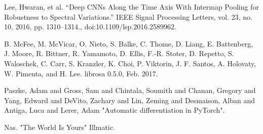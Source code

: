\documentclass[10pt,twocolumn,letterpaper]{article}
\begin{document}
\begin{thebibliography}{1}

Lee, Hwaran, et al. “Deep CNNs Along the Time Axis With Intermap Pooling for Robustness to Spectral Variations.” IEEE Signal Processing Letters, vol. 23, no. 10, 2016, pp. 1310–1314., doi:10.1109/lsp.2016.2589962.

B. McFee, M. McVicar, O. Nieto, S. Balke, C. Thome,
D. Liang, E. Battenberg, J. Moore, R. Bittner, R. Yamamoto,
D. Ellis, F.-R. Stoter, D. Repetto, S. Waloschek, C. Carr,
S. Kranzler, K. Choi, P. Viktorin, J. F. Santos, A. Holovaty,
W. Pimenta, and H. Lee. librosa 0.5.0, Feb. 2017.

Paszke, Adam and Gross, Sam and Chintala, Soumith and Chanan, Gregory and Yang, Edward and DeVito, Zachary and Lin, Zeming and Desmaison, Alban and Antiga, Luca and Lerer, Adam "Automatic differentiation in PyTorch".

Nas. "The World Is Yours" Illmatic.
\end{thebibliography}
\end{document}
